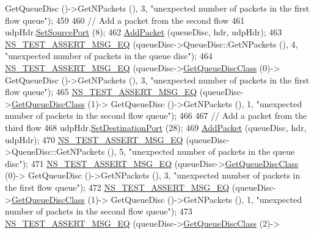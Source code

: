 \begin{DoxyCode}
      GetQueueDisc ()->GetNPackets (), 3, \textcolor{stringliteral}{"unexpected number of packets in the first flow queue"});
459 
460   \textcolor{comment}{// Add a packet from the second flow}
461   udpHdr.\hyperlink{classns3_1_1UdpHeader_ae10a7c9c6cbd645745bebc2a84a78831}{SetSourcePort} (8);
462   \hyperlink{classFqCoDelQueueDiscUDPFlowsSeparation_a632c0fbc4d46616fedb0b9ab9f75e769}{AddPacket} (queueDisc, hdr, udpHdr);
463   \hyperlink{group__testing_ga2a9d78cffb3db8e867c35fff0b698cf5}{NS\_TEST\_ASSERT\_MSG\_EQ} (queueDisc->QueueDisc::GetNPackets (), 4, \textcolor{stringliteral}{"unexpected number
       of packets in the queue disc"});
464   \hyperlink{group__testing_ga2a9d78cffb3db8e867c35fff0b698cf5}{NS\_TEST\_ASSERT\_MSG\_EQ} (queueDisc->\hyperlink{classns3_1_1QueueDisc_a584d228f7bff3f754d32793a38134556}{GetQueueDiscClass} (0)->
      GetQueueDisc ()->GetNPackets (), 3, \textcolor{stringliteral}{"unexpected number of packets in the first flow queue"});
465   \hyperlink{group__testing_ga2a9d78cffb3db8e867c35fff0b698cf5}{NS\_TEST\_ASSERT\_MSG\_EQ} (queueDisc->\hyperlink{classns3_1_1QueueDisc_a584d228f7bff3f754d32793a38134556}{GetQueueDiscClass} (1)->
      GetQueueDisc ()->GetNPackets (), 1, \textcolor{stringliteral}{"unexpected number of packets in the second flow queue"});
466 
467   \textcolor{comment}{// Add a packet from the third flow}
468   udpHdr.\hyperlink{classns3_1_1UdpHeader_af7f8bc1749481efe8ede173a71aa6727}{SetDestinationPort} (28);
469   \hyperlink{classFqCoDelQueueDiscUDPFlowsSeparation_a632c0fbc4d46616fedb0b9ab9f75e769}{AddPacket} (queueDisc, hdr, udpHdr);
470   \hyperlink{group__testing_ga2a9d78cffb3db8e867c35fff0b698cf5}{NS\_TEST\_ASSERT\_MSG\_EQ} (queueDisc->QueueDisc::GetNPackets (), 5, \textcolor{stringliteral}{"unexpected number
       of packets in the queue disc"});
471   \hyperlink{group__testing_ga2a9d78cffb3db8e867c35fff0b698cf5}{NS\_TEST\_ASSERT\_MSG\_EQ} (queueDisc->\hyperlink{classns3_1_1QueueDisc_a584d228f7bff3f754d32793a38134556}{GetQueueDiscClass} (0)->
      GetQueueDisc ()->GetNPackets (), 3, \textcolor{stringliteral}{"unexpected number of packets in the first flow queue"});
472   \hyperlink{group__testing_ga2a9d78cffb3db8e867c35fff0b698cf5}{NS\_TEST\_ASSERT\_MSG\_EQ} (queueDisc->\hyperlink{classns3_1_1QueueDisc_a584d228f7bff3f754d32793a38134556}{GetQueueDiscClass} (1)->
      GetQueueDisc ()->GetNPackets (), 1, \textcolor{stringliteral}{"unexpected number of packets in the second flow queue"});
473   \hyperlink{group__testing_ga2a9d78cffb3db8e867c35fff0b698cf5}{NS\_TEST\_ASSERT\_MSG\_EQ} (queueDisc->\hyperlink{classns3_1_1QueueDisc_a584d228f7bff3f754d32793a38134556}{GetQueueDiscClass} (2)->

\end{DoxyCode}
